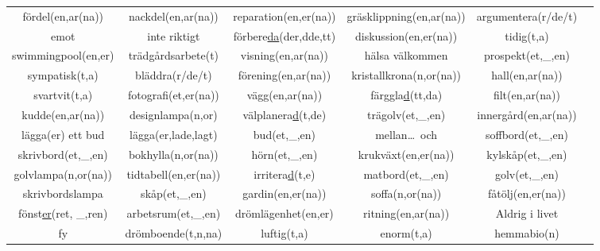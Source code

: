\begin{center}
\begin{adjustwidth}{-2.5cm}{}
\begin{tabular}{|c c c c c c|}
            fördel(en,ar(na)) & nackdel(en,ar(na)) & reparation(en,er(na)) & gräsklippning(en,ar(na)) & argumentera(r/de/t) &  \\
            emot & inte riktigt & förbere\underline{da}(der,dde,tt) & diskussion(en,er(na)) & tidig(t,a) &  \\
            swimmingpool(en,er) & trädgårdsarbete(t) & visning(en,ar(na)) & hälsa välkommen & prospekt(et,\_,en) &  \\
            sympatisk(t,a) & bläddra(r/de/t) & förening(en,ar(na)) & kristallkrona(n,or(na)) & hall(en,ar(na)) &  \\
            svartvit(t,a) & fotografi(et,er(na)) & vägg(en,ar(na)) & färggla\underline{d}(tt,da) & filt(en,ar(na)) &  \\
            kudde(en,ar(na)) & designlampa(n,or) & välplanera\underline{d}(t,de) & trägolv(et,\_,en) & innergård(en,ar(na)) &  \\
            lägga(er) ett bud & lägga(er,lade,lagt) & bud(et,\_,en) & mellan\ldots\ och & soffbord(et,\_,en) &  \\
            skrivbord(et,\_,en) & bokhylla(n,or(na)) & hörn(et,\_,en) & krukväxt(en,er(na)) & kylskåp(et,\_,en) &  \\
            golvlampa(n,or(na)) & tidtabell(en,er(na)) & irritera\underline{d}(t,e) & matbord(et,\_,en) & golv(et,\_,en) &  \\
            skrivbordslampa & skåp(et,\_,en) & gardin(en,er(na)) & soffa(n,or(na)) & fåtölj(en,er(na)) &  \\
            fönst\underline{er}(ret, \_,ren) & arbetsrum(et,\_,en) & drömlägenhet(en,er) & ritning(en,ar(na)) & Aldrig i livet &  \\
            fy & drömboende(t,n,na) & luftig(t,a) & enorm(t,a) & hemmabio(n) &  \\
            \hline
        \end{tabular}
    \end{adjustwidth}
\end{center}

